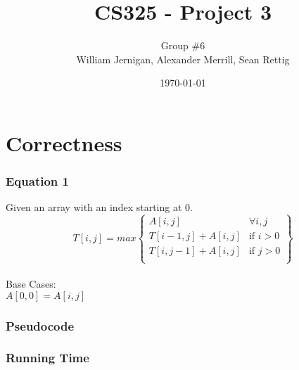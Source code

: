 \documentclass{article}
\title{CS325 - Project 3}
\author{Group \#6 \\ William Jernigan, Alexander Merrill, Sean Rettig}
\date{\today}
\begin{document}
\maketitle

\part*{Correctness}
\section*{Equation 1}
Given an array with an index starting at 0.\\

\[ T[i,j] = max \left\{ \begin{array}{ll}
    A[i,j] & \mbox{$\forall i, j$}\\
    T[i-1,j] + A[i,j] & \mbox{if $i > 0$}\\
    T[i,j-1] + A[i,j] & \mbox{if $j > 0$}\\\end{array} \right\} \] \\
Base Cases:\\
$A[0,0] = A[i,j]$\\


\section*{Pseudocode}


\section*{Running Time}
\end{document}

